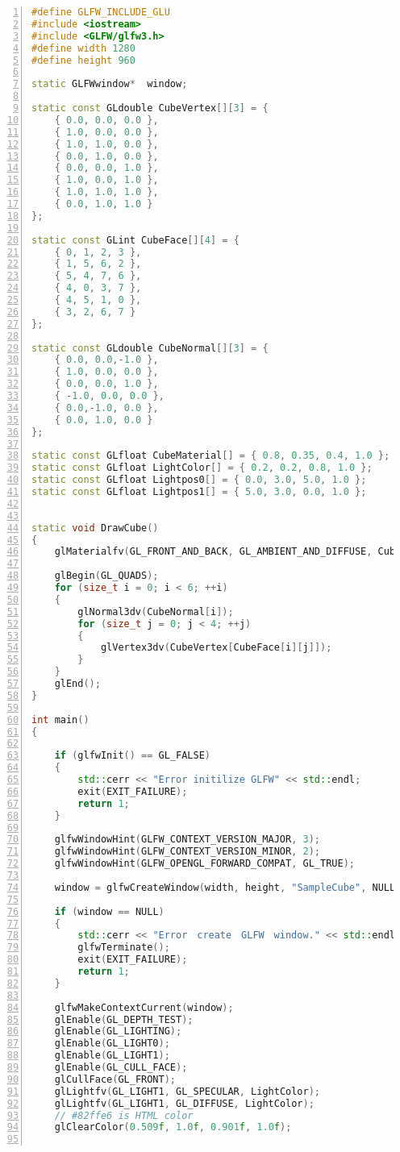 \documentclass[a4paper,titlepage]{jsarticle}
\begin{document}
\begin{lstlisting}[language=C++,numbers = left]
#define GLFW_INCLUDE_GLU
#include <iostream>
#include <GLFW/glfw3.h>
#define width 1280
#define height 960

static GLFWwindow*  window;

static const GLdouble CubeVertex[][3] = {
	{ 0.0, 0.0, 0.0 },
	{ 1.0, 0.0, 0.0 },
	{ 1.0, 1.0, 0.0 },
	{ 0.0, 1.0, 0.0 },
	{ 0.0, 0.0, 1.0 },
	{ 1.0, 0.0, 1.0 },
	{ 1.0, 1.0, 1.0 },
	{ 0.0, 1.0, 1.0 }
};

static const GLint CubeFace[][4] = {
	{ 0, 1, 2, 3 },
	{ 1, 5, 6, 2 },
	{ 5, 4, 7, 6 },
	{ 4, 0, 3, 7 },
	{ 4, 5, 1, 0 },
	{ 3, 2, 6, 7 }
};

static const GLdouble CubeNormal[][3] = {
	{ 0.0, 0.0,-1.0 },
	{ 1.0, 0.0, 0.0 },
	{ 0.0, 0.0, 1.0 },
	{ -1.0, 0.0, 0.0 },
	{ 0.0,-1.0, 0.0 },
	{ 0.0, 1.0, 0.0 }
};

static const GLfloat CubeMaterial[] = { 0.8, 0.35, 0.4, 1.0 };
static const GLfloat LightColor[] = { 0.2, 0.2, 0.8, 1.0 };
static const GLfloat Lightpos0[] = { 0.0, 3.0, 5.0, 1.0 };
static const GLfloat Lightpos1[] = { 5.0, 3.0, 0.0, 1.0 };


static void DrawCube()
{
	glMaterialfv(GL_FRONT_AND_BACK, GL_AMBIENT_AND_DIFFUSE, CubeMaterial);

	glBegin(GL_QUADS);
	for (size_t i = 0; i < 6; ++i)
	{
		glNormal3dv(CubeNormal[i]);
		for (size_t j = 0; j < 4; ++j)
		{
			glVertex3dv(CubeVertex[CubeFace[i][j]]);
		}
	}
	glEnd();
}

int main()
{

	if (glfwInit() == GL_FALSE)
	{
		std::cerr << "Error initilize GLFW" << std::endl;
		exit(EXIT_FAILURE);
		return 1;
	}

	glfwWindowHint(GLFW_CONTEXT_VERSION_MAJOR, 3);
	glfwWindowHint(GLFW_CONTEXT_VERSION_MINOR, 2);
	glfwWindowHint(GLFW_OPENGL_FORWARD_COMPAT, GL_TRUE);

	window = glfwCreateWindow(width, height, "SampleCube", NULL, NULL);

	if (window == NULL)
	{
		std::cerr << "Error　create　GLFW　window." << std::endl;
		glfwTerminate();
		exit(EXIT_FAILURE);
		return 1;
	}

	glfwMakeContextCurrent(window);
	glEnable(GL_DEPTH_TEST);
	glEnable(GL_LIGHTING);
	glEnable(GL_LIGHT0);
	glEnable(GL_LIGHT1);
	glEnable(GL_CULL_FACE);
	glCullFace(GL_FRONT);
	glLightfv(GL_LIGHT1, GL_SPECULAR, LightColor);
	glLightfv(GL_LIGHT1, GL_DIFFUSE, LightColor);
	// #82ffe6 is HTML color
	glClearColor(0.509f, 1.0f, 0.901f, 1.0f);


\end{lstlisting}
\end{document}

